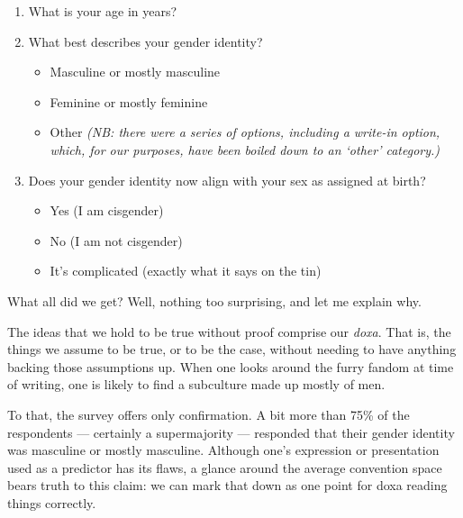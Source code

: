 \begin{enumerate}
  \item What is your age in years?
  \item What best describes your gender identity?
  \begin{itemize}
    \item Masculine or mostly masculine
    \item Feminine or mostly feminine
    \item Other \textit{(NB: there were a series of options, including a write-in option, which, for our purposes, have been boiled down to an `other' category.)}
  \end{itemize}
  \item Does your gender identity now align with your sex as assigned at birth?
  \begin{itemize}
    \item Yes (I am cisgender)
    \item No (I am not cisgender)
    \item It's complicated (exactly what it says on the tin)
  \end{itemize}
\end{enumerate}

What all did we get?  Well, nothing too surprising, and let me explain why.

The ideas that we hold to be true without proof comprise our \textit{doxa}.  That is, the things we assume to be true, or to be the case, without needing to have anything backing those assumptions up.  When one looks around the furry fandom at time of writing, one is likely to find a subculture made up mostly of men.

To that, the survey offers only confirmation.  A bit more than 75\% of the respondents --- certainly a supermajority --- responded that their gender identity was masculine or mostly masculine.  Although one's expression or presentation used as a predictor has its flaws, a glance around the average convention space bears truth to this claim: we can mark that down as one point for doxa reading things correctly.

